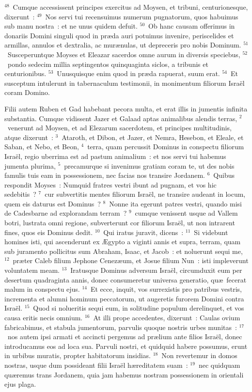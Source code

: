 ${}^{48}$~Cumque accessissent principes exercitus ad Moysen, et tribuni, centurionesque, dixerunt~:
${}^{49}$~Nos servi tui recensuimus numerum pugnatorum, quos habuimus sub manu nostra~: et ne unus quidem defuit.
${}^{50}$~Ob hanc causam offerimus in donariis Domini singuli quod in pr\ae da auri potuimus invenire, periscelides et armillas, annulos et dextralia, ac mur\ae nulas, ut depreceris pro nobis Dominum.
${}^{51}$~Susceperuntque Moyses et Eleazar sacerdos omne aurum in diversis speciebus,
${}^{52}$~pondo sedecim millia septingentos quinquaginta siclos, a tribunis et centurionibus.
${}^{53}$~Unusquisque enim quod in pr\ae da rapuerat, suum erat.
${}^{54}$~Et susceptum intulerunt in tabernaculum testimonii, in monimentum filiorum Isra\"el coram Domino.

\lettrine[lines=3,image=true,loversize=0.05,lraise=-0.03]{F}{}ilii autem Ruben et Gad habebant pecora multa, et erat illis in jumentis infinita substantia. Cumque vidissent Jazer et Galaad aptas animalibus alendis terras,
${}^{2}$~venerunt ad Moysen, et ad Elezarum sacerdotem, et principes multitudinis, atque dixerunt~:
${}^{3}$~Ataroth, et Dibon, et Jazer, et Nemra, Hesebon, et Eleale, et Saban, et Nebo, et Beon,
${}^{4}$~terra, quam percussit Dominus in conspectu filiorum Isra\"el, regio uberrima est ad pastum animalium~: et nos servi tui habemus jumenta plurima,
${}^{5}$~precamurque si invenimus gratiam coram te, ut des nobis famulis tuis eam in possessionem, nec facias nos transire Jordanem.
${}^{6}$~Quibus respondit Moyses~: Numquid fratres vestri ibunt ad pugnam, et vos hic sedebitis~?
${}^{7}$~cur subvertitis mentes filiorum Isra\"el, ne transire audeant in locum, quem eis daturus est Dominus~?
${}^{8}$~Nonne ita egerunt patres vestri, quando misi de Cadesbarne ad explorandam terram~?
${}^{9}$~cumque venissent usque ad Vallem botri, lustrata omni regione, subverterunt cor filiorum Isra\"el, ut non intrarent fines, quos eis Dominus dedit.
${}^{10}$~Qui iratus juravit, dicens~:
${}^{11}$~Si videbunt homines isti, qui ascenderunt ex \AE gypto a viginti annis et supra, terram, quam sub juramento pollicitus sum Abraham, Isaac, et Jacob~: et noluerunt sequi me,
${}^{12}$~pr\ae ter Caleb filium Jephone Cenez\ae um, et Josue filium Nun~: isti impleverunt voluntatem meam.
${}^{13}$~Iratusque Dominus adversum Isra\"el, circumduxit eum per desertum quadraginta annis, donec consumeretur universa generatio, qu\ae\ fecerat malum in conspectu ejus.
${}^{14}$~Et ecce, inquit, vos surrexistis pro patribus vestris, incrementa et alumni hominum peccatorum, ut augeretis furorem Domini contra Isra\"el.
${}^{15}$~Quod si nolueritis sequi eum, in solitudine populum derelinquet, et vos causa eritis necis omnium.
${}^{16}$~At illi prope accedentes, dixerunt~: Caulas ovium fabricabimus, et stabula jumentorum, parvulis quoque nostris urbes munitas~:
${}^{17}$~nos autem ipsi armati et accincti pergemus ad pr\ae lium ante filios Isra\"el, donec introducamus eos ad loca sua. Parvuli nostri, et quidquid habere possumus, erunt in urbibus muratis, propter habitatorum insidias.
${}^{18}$~Non revertemur in domos nostras, usque dum possideant filii Isra\"el h\ae reditatem suam~:
${}^{19}$~nec quidquam qu\ae remus trans Jordanem, quia jam habemus nostram possessionem in orientali ejus plaga.


